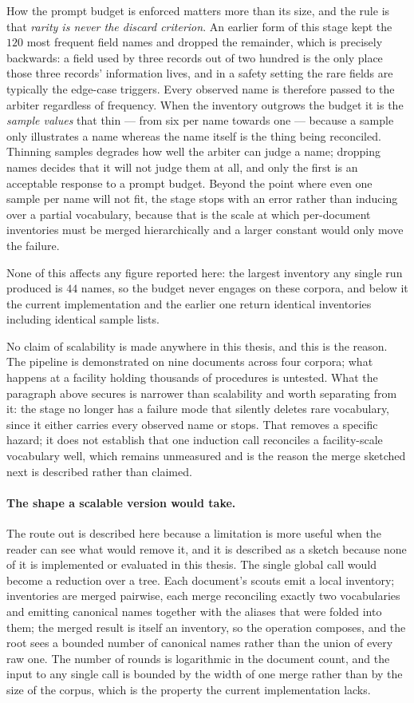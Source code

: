 \documentclass[11pt]{article}
\begin{document}
How the prompt budget is enforced matters more than its size, and the rule is
that \emph{rarity is never the discard criterion}. An earlier form of this stage
kept the $120$ most frequent field names and dropped the remainder, which is
precisely backwards: a field used by three records out of two hundred is the
only place those three records' information lives, and in a safety setting the
rare fields are typically the edge-case triggers. Every observed name is
therefore passed to the arbiter regardless of frequency. When the inventory
outgrows the budget it is the \emph{sample values} that thin --- from six per
name towards one --- because a sample only illustrates a name whereas the name
itself is the thing being reconciled. Thinning samples degrades how well the
arbiter can judge a name; dropping names decides that it will not judge them at
all, and only the first is an acceptable response to a prompt budget. Beyond the
point where even one sample per name will not fit, the stage stops with an error
rather than inducing over a partial vocabulary, because that is the scale at
which per-document inventories must be merged hierarchically and a larger
constant would only move the failure.

None of this affects any figure reported here: the largest inventory any single
run produced is $44$ names, so the budget never engages on these corpora, and
below it the current implementation and the earlier one return identical
inventories including identical sample lists.

No claim of scalability is made anywhere in this thesis, and this is the reason.
The pipeline is demonstrated on nine documents across four corpora; what happens
at a facility holding thousands of procedures is untested. What the paragraph
above secures is narrower than scalability and worth separating from it: the
stage no longer has a failure mode that silently deletes rare vocabulary, since
it either carries every observed name or stops. That removes a specific hazard;
it does not establish that one induction call reconciles a facility-scale
vocabulary well, which remains unmeasured and is the reason the merge sketched
next is described rather than claimed.

\paragraph{The shape a scalable version would take.} The route out is described
here because a limitation is more useful when the reader can see what would
remove it, and it is described as a sketch because none of it is implemented or
evaluated in this thesis. The single global call would become a reduction over
a tree. Each document's scouts emit a local inventory; inventories are merged
pairwise, each merge reconciling exactly two vocabularies and emitting canonical
names together with the aliases that were folded into them; the merged result is
itself an inventory, so the operation composes, and the root sees a bounded
number of canonical names rather than the union of every raw one. The number of
rounds is logarithmic in the document count, and the input to any single call is
bounded by the width of one merge rather than by the size of the corpus, which
is the property the current implementation lacks.
\end{document}
